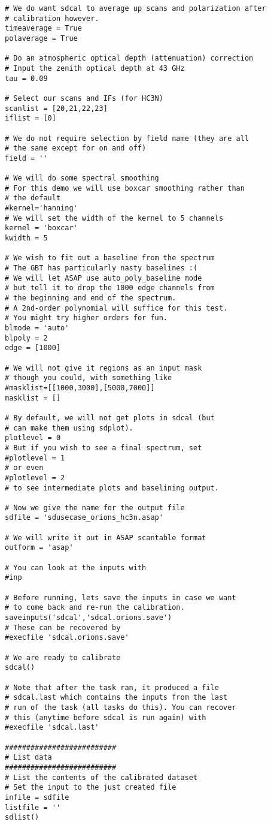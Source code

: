 \begin{verbatim}
# We do want sdcal to average up scans and polarization after
# calibration however.
timeaverage = True
polaverage = True

# Do an atmospheric optical depth (attenuation) correction
# Input the zenith optical depth at 43 GHz
tau = 0.09

# Select our scans and IFs (for HC3N)
scanlist = [20,21,22,23]
iflist = [0]

# We do not require selection by field name (they are all
# the same except for on and off)
field = ''

# We will do some spectral smoothing
# For this demo we will use boxcar smoothing rather than
# the default
#kernel='hanning'
# We will set the width of the kernel to 5 channels
kernel = 'boxcar'
kwidth = 5

# We wish to fit out a baseline from the spectrum
# The GBT has particularly nasty baselines :(
# We will let ASAP use auto_poly_baseline mode
# but tell it to drop the 1000 edge channels from
# the beginning and end of the spectrum.
# A 2nd-order polynomial will suffice for this test.
# You might try higher orders for fun.
blmode = 'auto'
blpoly = 2
edge = [1000]

# We will not give it regions as an input mask
# though you could, with something like
#masklist=[[1000,3000],[5000,7000]]
masklist = []

# By default, we will not get plots in sdcal (but
# can make them using sdplot).
plotlevel = 0
# But if you wish to see a final spectrum, set
#plotlevel = 1
# or even
#plotlevel = 2
# to see intermediate plots and baselining output.

# Now we give the name for the output file
sdfile = 'sdusecase_orions_hc3n.asap'

# We will write it out in ASAP scantable format
outform = 'asap'

# You can look at the inputs with
#inp

# Before running, lets save the inputs in case we want
# to come back and re-run the calibration.
saveinputs('sdcal','sdcal.orions.save')
# These can be recovered by
#execfile 'sdcal.orions.save'

# We are ready to calibrate
sdcal()

# Note that after the task ran, it produced a file
# sdcal.last which contains the inputs from the last
# run of the task (all tasks do this). You can recover
# this (anytime before sdcal is run again) with
#execfile 'sdcal.last'

##########################
# List data
##########################
# List the contents of the calibrated dataset
# Set the input to the just created file
infile = sdfile
listfile = ''
sdlist()


\end{verbatim}
